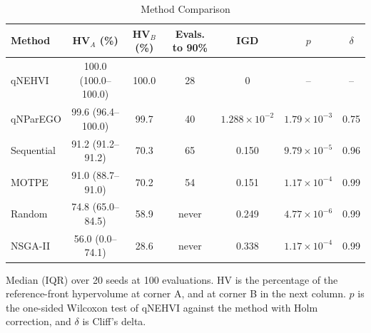 \begin{table}[t]
\centering
\caption{Method Comparison}
\label{tab:methods}
\small

\begin{tabular}{|l|c|c|c|c|c|c|}
\hline
\rowcolor{tblhead}
\textbf{Method} & \textbf{HV$_A$ (\%)} & \textbf{HV$_B$ (\%)} & \textbf{Evals. to 90\%} & \textbf{IGD} & \textbf{$p$} & \textbf{$\delta$} \\
\hline
qNEHVI & 100.0 (100.0--100.0) & 100.0 & 28 & 0 & -- & -- \\
\hline
qNParEGO & 99.6 (96.4--100.0) & 99.7 & 40 & $1.288\times10^{-2}$ & $1.79\times10^{-3}$ & 0.75 \\
\hline
Sequential & 91.2 (91.2--91.2) & 70.3 & 65 & 0.150 & $9.79\times10^{-5}$ & 0.96 \\
\hline
MOTPE & 91.0 (88.7--91.0) & 70.2 & 54 & 0.151 & $1.17\times10^{-4}$ & 0.99 \\
\hline
Random & 74.8 (65.0--84.5) & 58.9 & never & 0.249 & $4.77\times10^{-6}$ & 0.99 \\
\hline
NSGA-II & 56.0 (0.0--74.1) & 28.6 & never & 0.338 & $1.17\times10^{-4}$ & 0.99 \\
\hline
\end{tabular}

\vspace{2pt}
{\footnotesize Median (IQR) over 20 seeds at 100 evaluations. HV is the percentage of the reference-front hypervolume at corner A, and at corner B in the next column. $p$ is the one-sided Wilcoxon test of qNEHVI against the method with Holm correction, and $\delta$ is Cliff's delta.}
\end{table}
